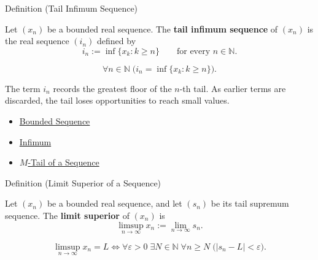 \begin{definitionbox}{Definition (Tail Infimum Sequence)}
\begin{definition}
\label{def:tail-infimum-sequence}
Let $(x_n)$ be a bounded real sequence. The \textbf{tail infimum
sequence} of $(x_n)$ is the real sequence $(i_n)$ defined by
\[
  i_n:=\inf\{x_k:k\ge n\}
  \qquad\text{for every } n\in\mathbb{N}.
\]
\end{definition}
\end{definitionbox}

\begin{remark*}
\[
\forall n\in\mathbb{N}\;
\bigl(i_n=\inf\{x_k:k\ge n\}\bigr).
\]
\end{remark*}

\begin{remark*}[Interpretation]
The term $i_n$ records the greatest floor of the $n$-th tail. As earlier
terms are discarded, the tail loses opportunities to reach small values.
\end{remark*}

\begin{dependencies}
\begin{itemize}
  \item \hyperref[def:bounded-sequence]{Bounded Sequence}
  \item \hyperref[def:infimum]{Infimum}
  \item \hyperref[def:m-tail]{$M$-Tail of a Sequence}
\end{itemize}
\end{dependencies}


\begin{definitionbox}{Definition (Limit Superior of a Sequence)}
\begin{definition}
\label{def:limsup-sequence}
Let $(x_n)$ be a bounded real sequence, and let $(s_n)$ be its tail
supremum sequence. The \textbf{limit superior} of $(x_n)$ is
\[
  \limsup_{n\to\infty}x_n:=\lim_{n\to\infty}s_n.
\]
\end{definition}
\end{definitionbox}

\begin{remark*}
\[
\limsup_{n\to\infty}x_n=L
\Longleftrightarrow
\forall \varepsilon>0\;\exists N\in\mathbb{N}\;\forall n\ge N
\;\bigl(|s_n-L|<\varepsilon\bigr).
\]
\end{remark*}

